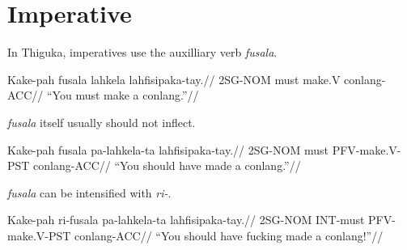 \newpage

\section{Imperative}

In Thiguka, imperatives use the auxilliary verb \textit{fusala}.

\ex
\begingl
\gla  Kake-pah fusala lahkela lahfisipaka-tay.//
\glb  2SG-NOM  must   make.V  conlang-ACC//
\glft ``You must make a conlang.''//
\endgl
\xe

\textit{fusala} itself usually should not inflect.

\ex
\begingl
\gla  Kake-pah fusala pa-lahkela-ta  lahfisipaka-tay.//
\glb  2SG-NOM  must   PFV-make.V-PST conlang-ACC//
\glft ``You should have made a conlang.''//
\endgl
\xe

\textit{fusala} can be intensified with \textit{ri-}.

\ex
\begingl
\gla  Kake-pah ri-fusala pa-lahkela-ta  lahfisipaka-tay.//
\glb  2SG-NOM  INT-must  PFV-make.V-PST conlang-ACC//
\glft ``You should have fucking made a conlang!''//
\endgl
\xe
